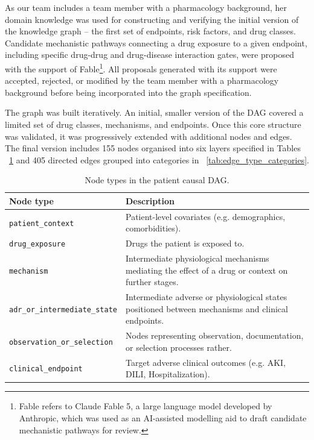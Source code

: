 As our team includes a team member with a pharmacology background, her
domain knowledge was used for constructing and verifying the initial version
of the knowledge graph -- the first set of endpoints, risk factors, and
drug classes. Candidate mechanistic pathways connecting a drug exposure to a
given endpoint, including specific drug-drug and drug-disease interaction
gates, were proposed with the support of
Fable\footnote{Fable refers to Claude Fable 5, a large language model
developed by Anthropic, which was used as an AI-assisted modelling aid to
draft candidate mechanistic pathways for review.}. All proposals generated
with its support were accepted, rejected, or modified by the team member
with a pharmacology background before being incorporated into the graph
specification.

The graph was built iteratively. An initial, smaller version of the DAG
covered a limited set of drug classes, 
mechanisms, and endpoints. Once this core structure was
validated, it was progressively extended with
additional nodes and edges. The final version includes 155 nodes organised
into six layers specified in Tables ~\ref{tab:node_types} and 405 directed edges grouped into categories in 
~\ref{tab:edge_type_categories}.

\begin{table}[htbp]
    \centering
    \caption{Node types in the patient causal DAG.}
    \label{tab:node_types}
    \begin{tabularx}{\textwidth}{@{}l X@{}}
        \toprule
        \textbf{Node type} & \textbf{Description} \\
        \midrule
        \texttt{patient\_context} & Patient-level covariates (e.g. demographics, comorbidities). \\
        \addlinespace
        \texttt{drug\_exposure} & Drugs the patient is exposed to. \\
        \addlinespace
        \texttt{mechanism} & Intermediate physiological mechanisms mediating the effect of a drug or context on further stages. \\
        \addlinespace
        \texttt{adr\_or\_intermediate\_state} & Intermediate adverse or physiological states positioned between mechanisms and clinical endpoints. \\
        \addlinespace
        \texttt{observation\_or\_selection} & Nodes representing observation, documentation, or selection processes rather. \\
        \addlinespace
        \texttt{clinical\_endpoint} & Target adverse clinical outcomes (e.g. AKI, DILI, Hospitalization). \\
        \bottomrule
    \end{tabularx}
\end{table}


